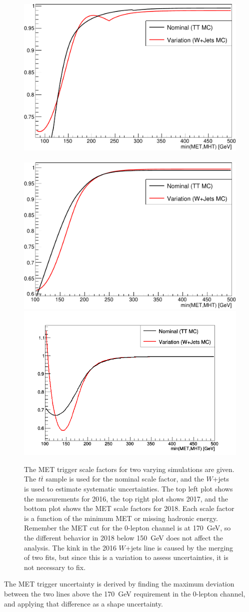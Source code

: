 \begin{figure}
  \centering
  \includegraphics[width=0.45\linewidth]{figures/METSF2016.pdf}~
  \includegraphics[width=0.45\linewidth]{figures/METSF2017.pdf} \\
  \includegraphics[width=0.45\linewidth,trim={1.5cm 0 0 0},clip]{figures/METSF2018.png}
  \caption[MET trigger scale factors]{
    The MET trigger scale factors for two varying simulations are given.
    The $t\bar{t}$ sample is used for the nominal scale factor,
    and the $W$+jets is used to estimate systematic uncertainties.
    The top left plot shows the measurements for 2016,
    the top right plot shows 2017,
    and the bottom plot shows the MET scale factors for 2018.
    Each scale factor is a function of the minimum MET or missing hadronic energy.
    Remember the MET cut for the 0-lepton channel is at \SI{170}{GeV},
    so the different behavior in 2018 below \SI{150}{GeV} does not affect the analysis.
    The kink in the 2016 $W$+jets line is caused by the merging of two fits,
    but since this is a variation to assess uncertainties, it is not necessary to fix.
  }
  \label{fig:met-sf}
\end{figure}
The MET trigger uncertainty is derived by finding the maximum deviation between the two lines above
the \SI{170}{GeV} requirement in the 0-lepton channel,
and applying that difference as a shape uncertainty.

